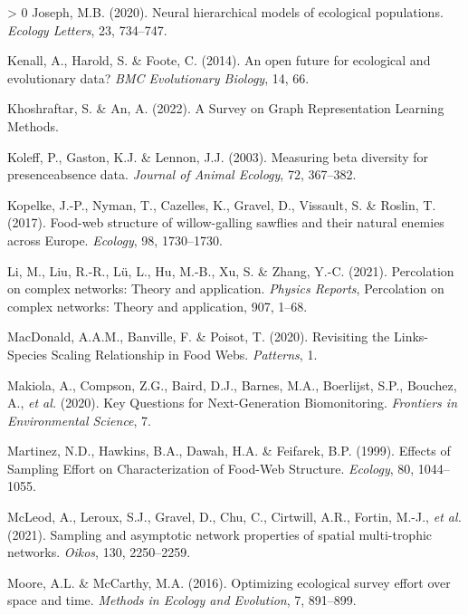 \documentclass[10pt,oneside]{article}
\newlength{\cslhangindent}
\newenvironment{CSLReferences}[3] %
 {%
  \setlength{\parindent}{0pt}
  \ifodd #1 \everypar{\setlength{\hangindent}{\cslhangindent}}\ignorespaces\fi
  \ifnum #2 > 0
  \setlength{\parskip}{#2\baselineskip}
  \fi
 }%
 {}
\begin{document}
\begin{CSLReferences}{1}{0}
\leavevmode\hypertarget{ref-Joseph2020NeuHie}{}%
Joseph, M.B. (2020). Neural hierarchical models of ecological
populations. \emph{Ecology Letters}, 23, 734--747.

\leavevmode\hypertarget{ref-Kenall2014OpeFut}{}%
Kenall, A., Harold, S. \& Foote, C. (2014). An open future for
ecological and evolutionary data? \emph{BMC Evolutionary Biology}, 14,
66.

\leavevmode\hypertarget{ref-Khoshraftar2022SurGra}{}%
Khoshraftar, S. \& An, A. (2022). A Survey on Graph Representation
Learning Methods.

\leavevmode\hypertarget{ref-Koleff2003MeaBet}{}%
Koleff, P., Gaston, K.J. \& Lennon, J.J. (2003). Measuring beta
diversity for presenceabsence data. \emph{Journal of Animal Ecology},
72, 367--382.

\leavevmode\hypertarget{ref-Kopelke2017FooStr}{}%
Kopelke, J.-P., Nyman, T., Cazelles, K., Gravel, D., Vissault, S. \&
Roslin, T. (2017). Food-web structure of willow-galling sawflies and
their natural enemies across Europe. \emph{Ecology}, 98, 1730--1730.

\leavevmode\hypertarget{ref-Li2021PerCom}{}%
Li, M., Liu, R.-R., Lü, L., Hu, M.-B., Xu, S. \& Zhang, Y.-C. (2021).
Percolation on complex networks: Theory and application. \emph{Physics
Reports}, Percolation on complex networks: Theory and application, 907,
1--68.

\leavevmode\hypertarget{ref-MacDonald2020RevLin}{}%
MacDonald, A.A.M., Banville, F. \& Poisot, T. (2020). Revisiting the
Links-Species Scaling Relationship in Food Webs. \emph{Patterns}, 1.

\leavevmode\hypertarget{ref-Makiola2020KeyQue}{}%
Makiola, A., Compson, Z.G., Baird, D.J., Barnes, M.A., Boerlijst, S.P.,
Bouchez, A., \emph{et al.} (2020). Key Questions for Next-Generation
Biomonitoring. \emph{Frontiers in Environmental Science}, 7.

\leavevmode\hypertarget{ref-Martinez1999EffSam}{}%
Martinez, N.D., Hawkins, B.A., Dawah, H.A. \& Feifarek, B.P. (1999).
Effects of Sampling Effort on Characterization of Food-Web Structure.
\emph{Ecology}, 80, 1044--1055.

\leavevmode\hypertarget{ref-McLeod2021SamAsy}{}%
McLeod, A., Leroux, S.J., Gravel, D., Chu, C., Cirtwill, A.R., Fortin,
M.-J., \emph{et al.} (2021). Sampling and asymptotic network properties
of spatial multi-trophic networks. \emph{Oikos}, 130, 2250--2259.

\leavevmode\hypertarget{ref-Moore2016OptEco}{}%
Moore, A.L. \& McCarthy, M.A. (2016). Optimizing ecological survey
effort over space and time. \emph{Methods in Ecology and Evolution}, 7,
891--899.


\end{CSLReferences}
\end{document}
